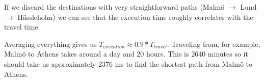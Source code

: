 \documentclass[a4paper,11pt]{article}
\begin{document}
If we discard the destinations with very straightforward paths (Malmö $\rightarrow$ Lund $\rightarrow$ Hässleholm) we can see that the execution time roughly correlates with the travel time.

Averaging everything gives us $T_{execution} \approx 0.9 * T_{travel}$. Traveling from, for example, Malmö to Athens takes around a day and 20 hours. This is 2640 minutes so it should take us approximately 2376 ms to find the shortest path from Malmö to Athens.
\end{document}
